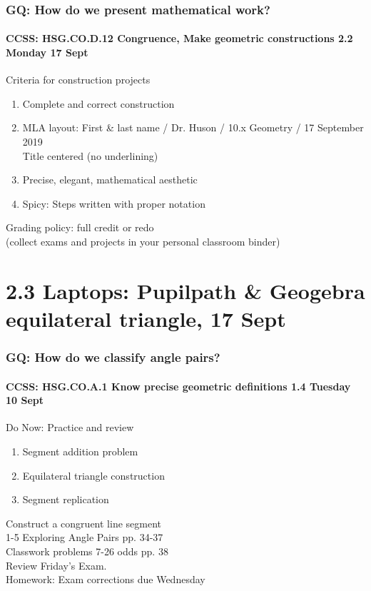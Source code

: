 \documentclass{beamer}
\begin{document}
  \frame
  {
    \frametitle{GQ: How do we present mathematical work?}
    \framesubtitle{CCSS: HSG.CO.D.12 Congruence, Make geometric constructions  \hfill \alert{2.2 Monday 17 Sept}}

    \begin{block}{Criteria for construction projects}
    \begin{enumerate}
        \item Complete and correct construction
        \item MLA layout: First \& last name / Dr. Huson / 10.x Geometry / 17 September 2019 \\
        Title centered (no underlining)
        \item Precise, elegant, mathematical aesthetic
        \item Spicy: Steps written with proper notation
    \end{enumerate}
    \end{block}
    Grading policy: full credit or redo\\[5pt]
    (collect exams and projects in your personal classroom binder)
  }

  \section{2.3 Laptops: Pupilpath \& Geogebra equilateral triangle, 17 Sept}
    \frame
    {
      \frametitle{GQ: How do we classify angle pairs?}
      \framesubtitle{CCSS: HSG.CO.A.1 Know precise geometric definitions \hfill \alert{1.4 Tuesday 10 Sept}}

      \begin{block}{Do Now: Practice and review}
      \begin{enumerate}
          \item Segment addition problem
          \item Equilateral triangle construction
          \item Segment replication
      \end{enumerate}
      \end{block}
      Construct a congruent line segment \\
      1-5 Exploring Angle Pairs pp. 34-37\\
      Classwork problems 7-26 odds pp. 38\\
      Review Friday's Exam.\\
      \vspace{0.5cm}
      Homework: Exam corrections due Wednesday\\
    }
\end{document}
